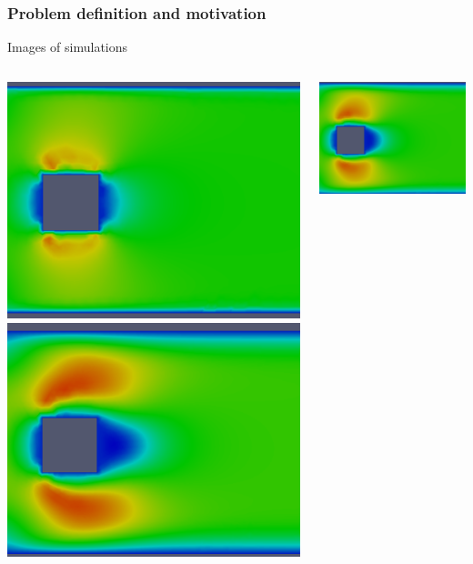 \documentclass[18pt]{beamer}
\begin{document}
\begin{frame}
  \frametitle{Problem definition and motivation}
  Images of simulations
    \begin{columns}
      \begin{column}{0.5\textwidth}
        \begin{center}
          \includegraphics[scale=0.3]{images/flow-1}
          \includegraphics[scale=0.3]{images/flow-3}
        \end{center}
      \end{column}
      \hspace*{-1.5cm}
    \begin{column}{0.5\textwidth}
      \begin{center}
        \includegraphics[scale=0.3]{images/flow-2}

\end{center}
\end{column}
\end{columns}
\end{frame}
\end{document}
